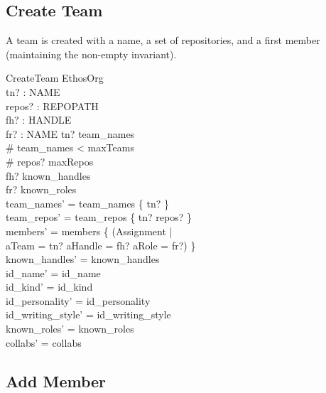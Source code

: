 \documentclass[a4paper,10pt,fleqn]{article}
\begin{document}
\subsection{Create Team}

A team is created with a name, a set of repositories, and a first
member (maintaining the non-empty invariant).

\begin{schema}{CreateTeam}
  \Delta EthosOrg \\
  tn? : NAME \\
  repos? : \finset REPOPATH \\
  fh? : HANDLE \\
  fr? : NAME
\where
  tn? \notin team\_names \\
  \# team\_names < maxTeams \\
  \# repos? \leq maxRepos \\
  fh? \in known\_handles \\
  fr? \in known\_roles \\
  team\_names' = team\_names \cup \{ tn? \} \\
  team\_repos' = team\_repos \cup \{ tn? \mapsto repos? \} \\
  members' = members \cup \{ (\mu Assignment | \\
  \quad aTeam = tn? \land aHandle = fh? \land aRole = fr?) \} \\
  known\_handles' = known\_handles \\
  id\_name' = id\_name \\
  id\_kind' = id\_kind \\
  id\_personality' = id\_personality \\
  id\_writing\_style' = id\_writing\_style \\
  known\_roles' = known\_roles \\
  collabs' = collabs
\end{schema}

\subsection{Add Member}
\end{document}
